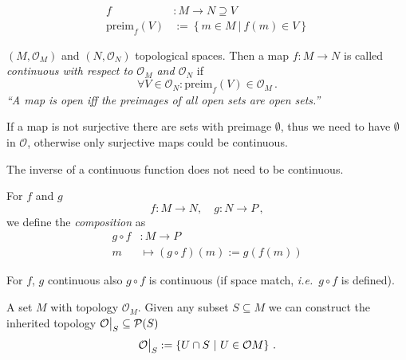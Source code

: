 \documentclass[11pt, a4paper, twocolumn]{article} %
\begin{document}
\begin{defn}[Preimage]
    \begin{align}
        f&: M \to N \supseteq V \nonumber \\
        \text{preim}_f(V) &:= \left\{ m\in M~|~f(m) \in V \right\}
    \end{align}
\end{defn}

\begin{defn}[Continuity]
    $(M, \mathcal{O}_M)$ and $(N, \mathcal{O}_N)$ topological spaces.
    Then a map $f: M \to N$ is called \textit{continuous with respect to $\mathcal{O}_M$ and
    $\mathcal{O}_N$} if
    \begin{equation}
        \boxed{
    \forall V\in \mathcal{O}_N: \text{preim}_f(V) \in \mathcal{O}_M
}\,.
    \end{equation}
    \textit{``A map is open iff the preimages of all open sets are open sets.''}
\end{defn}

\begin{note}
    If a map is not surjective there are sets with preimage $\emptyset$, thus we need to have
    $\emptyset$ in $\mathcal{O}$, otherwise only surjective maps could be continuous.
\end{note}
\begin{note}
    The inverse of a continuous function does not need to be continuous.
\end{note}

\begin{defn}
    For $f$ and $g$
    \begin{equation*}
        f: M \to N, \quad g: N \to P\,,
    \end{equation*}
    we define the \textit{composition} as
    \begin{align}
        g \circ f&: M \to P \\
        m &\mapsto (g\circ f)(m) := g(f(m)) \nonumber
    \end{align}
\end{defn}

\begin{theorem}
    For $f$, $g$ continuous also $g\circ f$ is continuous (if space match, \textit{i.e.}\ $g\circ f$ is defined).
\end{theorem}


\begin{defn}
    A set $M$ with topology $\mathcal{O}_M$. Given any subset $S \subseteq M$ we
    can construct the inherited topology $\mathcal{O}\big|_S \subseteq \mathcal{P}(S)$
    \begin{equation}
        \mathcal{O}\big|_S := \left\{ U\cap S~|~U\in \mathcal{O}M \right\}\,.
    \end{equation}
\end{defn}
\end{document}
